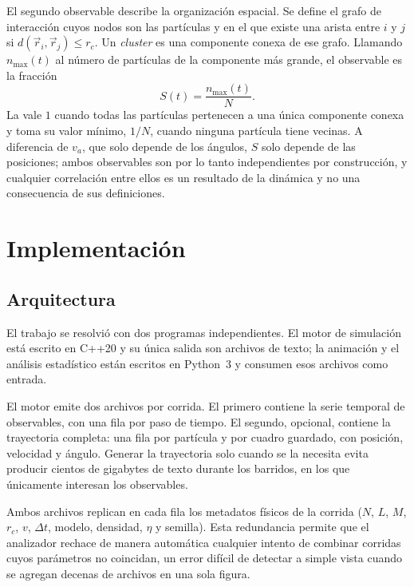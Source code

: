 \documentclass[11pt,a4paper]{article}
\begin{document}
El segundo observable describe la organización espacial. Se define el grafo de
interacción cuyos nodos son las partículas y en el que existe una arista entre
$i$ y $j$ si $d(\vec{r}_i, \vec{r}_j) \le r_c$. Un \emph{cluster} es una
componente conexa de ese grafo. Llamando $n_{\max}(t)$ al número de partículas de
la componente más grande, el observable es la fracción
%
\begin{equation}
\label{eq:cluster}
S(t) = \frac{n_{\max}(t)}{N}.
\end{equation}
%
La  vale $1$ cuando todas las partículas pertenecen a una única
componente conexa y toma su valor mínimo, $1/N$, cuando ninguna partícula tiene
vecinas. A diferencia de $v_a$, que solo depende de los ángulos, $S$ solo depende
de las posiciones; ambos observables son por lo tanto independientes por
construcción, y cualquier correlación entre ellos es un resultado de la dinámica
y no una consecuencia de sus definiciones.

\section{Implementación}
\label{sec:implementacion}

\subsection{Arquitectura}

El trabajo se resolvió con dos programas independientes. El motor de simulación
está escrito en C++20 y su única salida son archivos de texto; la animación y el
análisis estadístico están escritos en Python~3 y consumen esos archivos como
entrada.

El motor emite dos archivos por corrida. El primero contiene la serie temporal de
observables, con una fila por paso de tiempo. El segundo, opcional, contiene la
trayectoria completa: una fila por partícula y por cuadro guardado, con posición,
velocidad y ángulo. Generar la trayectoria solo cuando se la necesita evita
producir cientos de gigabytes de texto durante los barridos, en los que
únicamente interesan los observables.

Ambos archivos replican en cada fila los metadatos físicos de la corrida
($N$, $L$, $M$, $r_c$, $v$, $\Delta t$, modelo, densidad, $\eta$ y semilla). Esta
redundancia permite que el analizador rechace de manera automática cualquier
intento de combinar corridas cuyos parámetros no coincidan, un error difícil de
detectar a simple vista cuando se agregan decenas de archivos en una sola figura.
\end{document}
